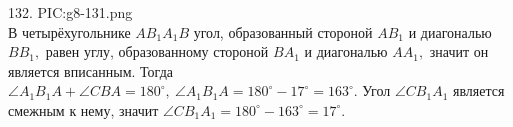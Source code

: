 132. {{PIC:g8-131.png}}\\
В четырёхугольнике $AB_1A_1B$ угол, образованный стороной $AB_1$ и диагональю $BB_1,$ равен углу, образованному стороной $BA_1$ и диагональю $AA_1,$ значит он является вписанным. Тогда $\angle A_1B_1A+\angle CBA=180^\circ,\ \angle A_1B_1A=180^\circ-17^\circ=163^\circ.$ Угол $\angle CB_1A_1$ является смежным к нему, значит $\angle CB_1A_1=180^\circ-163^\circ=17^\circ.$\\
